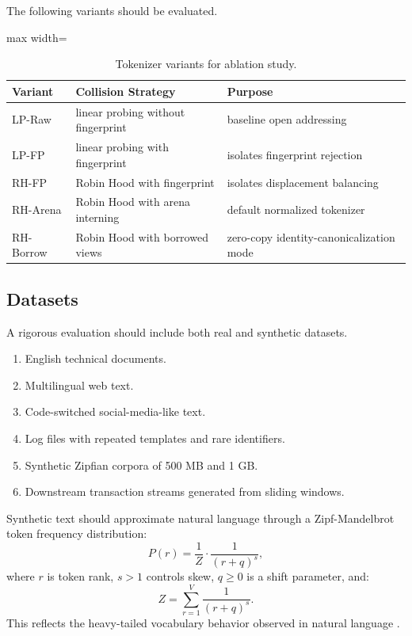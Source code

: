 \documentclass[11pt,a4paper]{article}
\begin{document}
The following variants should be evaluated.

\begin{table}[H]
\centering
\caption{Tokenizer variants for ablation study.}
\label{tab:variants}
\small
\begin{adjustbox}{max width=\textwidth}
\begin{tabular}{lll}
\toprule
Variant & Collision Strategy & Purpose \\
\midrule
LP-Raw & linear probing without fingerprint & baseline open addressing \\
LP-FP & linear probing with fingerprint & isolates fingerprint rejection \\
RH-FP & Robin Hood with fingerprint & isolates displacement balancing \\
RH-Arena & Robin Hood with arena interning & default normalized tokenizer \\
RH-Borrow & Robin Hood with borrowed views & zero-copy identity-canonicalization mode \\
\bottomrule
\end{tabular}
\end{adjustbox}
\end{table}

\subsection{Datasets}

A rigorous evaluation should include both real and synthetic datasets.

\begin{enumerate}[label=(\arabic*)]
\item English technical documents.
\item Multilingual web text.
\item Code-switched social-media-like text.
\item Log files with repeated templates and rare identifiers.
\item Synthetic Zipfian corpora of 500 MB and 1 GB.
\item Downstream transaction streams generated from sliding windows.
\end{enumerate}

Synthetic text should approximate natural language through a Zipf-Mandelbrot token frequency distribution:
\[
P(r)=\frac{1}{Z}\cdot\frac{1}{(r+q)^s},
\]
where \(r\) is token rank, \(s>1\) controls skew, \(q\ge0\) is a shift parameter, and:
\[
Z=\sum_{r=1}^{V}\frac{1}{(r+q)^s}.
\]
This reflects the heavy-tailed vocabulary behavior observed in natural language \cite{Piantadosi2014Zipf}.
\end{document}
